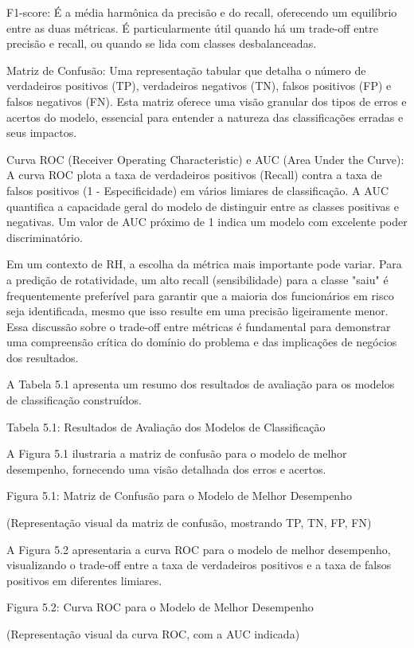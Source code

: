 \documentclass[sigconf]{acmart}
\begin{document}
F1-score: É a média harmônica da precisão e do recall, oferecendo um equilíbrio entre as duas métricas. É particularmente útil quando há um trade-off entre precisão e recall, ou quando se lida com classes desbalanceadas.

Matriz de Confusão: Uma representação tabular que detalha o número de verdadeiros positivos (TP), verdadeiros negativos (TN), falsos positivos (FP) e falsos negativos (FN). Esta matriz oferece uma visão granular dos tipos de erros e acertos do modelo, essencial para entender a natureza das classificações erradas e seus impactos.

Curva ROC (Receiver Operating Characteristic) e AUC (Area Under the Curve): A curva ROC plota a taxa de verdadeiros positivos (Recall) contra a taxa de falsos positivos (1 - Especificidade) em vários limiares de classificação. A AUC quantifica a capacidade geral do modelo de distinguir entre as classes positivas e negativas. Um valor de AUC próximo de 1 indica um modelo com excelente poder discriminatório.

Em um contexto de RH, a escolha da métrica mais importante pode variar. Para a predição de rotatividade, um alto recall (sensibilidade) para a classe "saiu" é frequentemente preferível para garantir que a maioria dos funcionários em risco seja identificada, mesmo que isso resulte em uma precisão ligeiramente menor. Essa discussão sobre o trade-off entre métricas é fundamental para demonstrar uma compreensão crítica do domínio do problema e das implicações de negócios dos resultados.

A Tabela 5.1 apresenta um resumo dos resultados de avaliação para os modelos de classificação construídos.

Tabela 5.1: Resultados de Avaliação dos Modelos de Classificação

A Figura 5.1 ilustraria a matriz de confusão para o modelo de melhor desempenho, fornecendo uma visão detalhada dos erros e acertos.

Figura 5.1: Matriz de Confusão para o Modelo de Melhor Desempenho

(Representação visual da matriz de confusão, mostrando TP, TN, FP, FN)

A Figura 5.2 apresentaria a curva ROC para o modelo de melhor desempenho, visualizando o trade-off entre a taxa de verdadeiros positivos e a taxa de falsos positivos em diferentes limiares.

Figura 5.2: Curva ROC para o Modelo de Melhor Desempenho

(Representação visual da curva ROC, com a AUC indicada)
\end{document}
